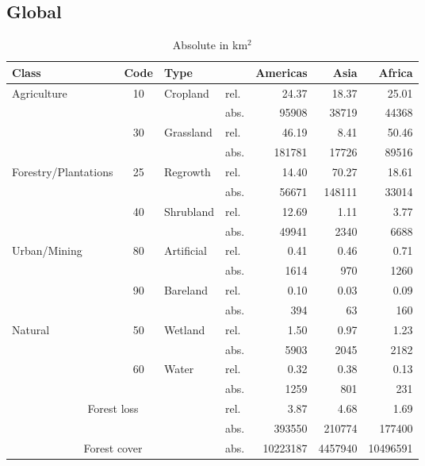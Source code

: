 		\subsection{Global}
			\begin{table}[ht]
				\centering
				\caption[Deforestation driver]{Absolute in km$^2$}
				\label{tab:driver_tab}
				\begin{tabular}{lcllrrr}
					Class & Code & Type & & Americas & Asia & Africa \\\hline
					\multirow{4}{*}{Agriculture} & \multirow{2}{*}{10} & \multirow{2}{*}{Cropland} & rel. & 24.37 & 18.37 & 25.01 \\
					& & & abs. & 95908 & 38719 & 44368 \\
					& \multirow{2}{*}{30} & \multirow{2}{*}{Grassland} & rel. & 46.19 & 8.41 & 50.46 \\
					& & & abs. & 181781 & 17726 & 89516 \\
					\multirow{4}{*}{Forestry/Plantations} & \multirow{2}{*}{25} & \multirow{2}{*}{Regrowth} & rel. & 14.40 & 70.27 & 18.61 \\
					& & & abs. & 56671 & 148111 & 33014 \\
					& \multirow{2}{*}{40} & \multirow{2}{*}{Shrubland} & rel. & 12.69 & 1.11 & 3.77 \\
					& & & abs. & 49941 & 2340 & 6688 \\
					\multirow{4}{*}{Urban/Mining} & \multirow{2}{*}{80} & \multirow{2}{*}{Artificial} & rel. & 0.41 & 0.46 & 0.71 \\
					& & & abs. & 1614 & 970 & 1260 \\
					& \multirow{2}{*}{90} & \multirow{2}{*}{Bareland} & rel. & 0.10 & 0.03 & 0.09 \\
					& & & abs. & 394 & 63 & 160 \\
					\multirow{4}{*}{Natural} & \multirow{2}{*}{50} & \multirow{2}{*}{Wetland} & rel. & 1.50 & 0.97 & 1.23 \\
					& & & abs. & 5903 & 2045 & 2182 \\
					& \multirow{2}{*}{60} & \multirow{2}{*}{Water} & rel. & 0.32 & 0.38 & 0.13 \\
					& & & abs. & 1259 & 801 & 231 \\\hline
					\multicolumn{3}{c}{\multirow{2}{*}{Forest loss}} & rel. & 3.87 & 4.68 & 1.69 \\
					& & & abs. & 393550 & 210774 & 177400 \\
					\multicolumn{3}{c}{Forest cover} & abs. & 10223187 & 4457940 & 10496591 \\\hline
				\end{tabular}
			\end{table}

